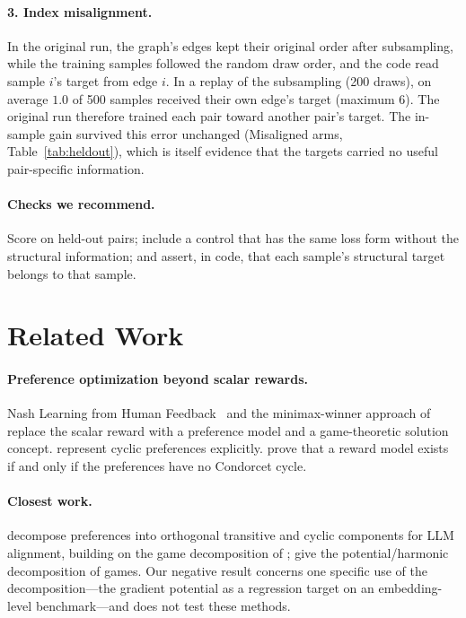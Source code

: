 \documentclass{article}
\begin{document}
\paragraph{3. Index misalignment.} In the original run, the graph's edges kept their original order after subsampling, while the training samples followed the random draw order, and the code read sample $i$'s target from edge $i$. In a replay of the subsampling (200 draws), on average $1.0$ of 500 samples received their own edge's target (maximum 6). The original run therefore trained each pair toward another pair's target. The in-sample gain survived this error unchanged (Misaligned arms, Table~\ref{tab:heldout}), which is itself evidence that the targets carried no useful pair-specific information.

\paragraph{Checks we recommend.} Score on held-out pairs; include a control that has the same loss form without the structural information; and assert, in code, that each sample's structural target belongs to that sample.

\section{Related Work}
\label{sec:related}

\paragraph{Preference optimization beyond scalar rewards.} Nash Learning from Human Feedback~\citep{munos2023nash} and the minimax-winner approach of \citet{swamy2024minimaximalist} replace the scalar reward with a preference model and a game-theoretic solution concept. \citet{zhang2025gpm} represent cyclic preferences explicitly. \citet{liu2025impossibility} prove that a reward model exists if and only if the preferences have no Condorcet cycle.

\paragraph{Closest work.} \citet{huang2026transitivity} decompose preferences into orthogonal transitive and cyclic components for LLM alignment, building on the game decomposition of \citet{balduzzi2019open}; \citet{candogan2011flows} give the potential/harmonic decomposition of games. Our negative result concerns one specific use of the decomposition---the gradient potential as a regression target on an embedding-level benchmark---and does not test these methods.
\end{document}
